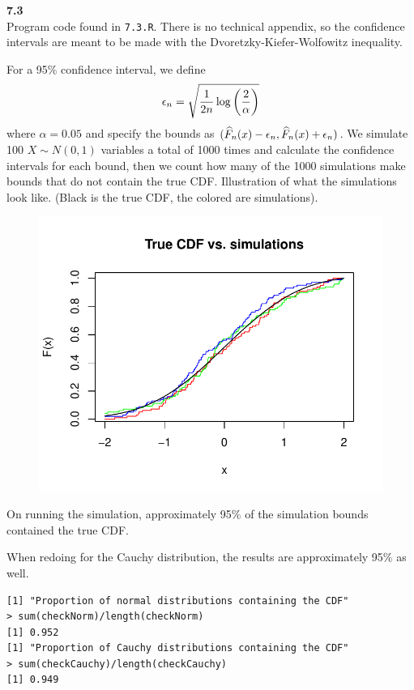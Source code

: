 \bigskip\noindent
\textbf{7.3}\\  %
Program code found in \texttt{7.3.R}. There is no technical appendix, so the confidence
intervals are meant to be made with the Dvoretzky-Kiefer-Wolfowitz inequality.

For a 95\% confidence interval, we define
$$
\epsilon_n = \sqrt{\frac{1}{2n}\log\left(\frac{2}{\alpha}\right)}
$$
where $\alpha = 0.05$ and specify the bounds as
$(\widehat{F}_n(x) - \epsilon_n, \widehat{F}_n(x) + \epsilon_n)$. We simulate 100 $X\sim N(0,1)$ variables
a total of 1000 times and calculate the confidence intervals for each bound, then we count
how many of the 1000 simulations make bounds that do not contain the true CDF.
Illustration of what the simulations look like. (Black is the true CDF, the colored are simulations).
\begin{figure}[H]
    \centering
    \includegraphics[scale=0.69]{ch7_3.pdf}
\end{figure}

\newpage\noindent
On running the simulation, approximately 95\% of the simulation bounds contained the true CDF.

When redoing for the Cauchy distribution, the results are approximately 95\% as well.
\begin{lstlisting}[style=RSyntax, title=R]
[1] "Proportion of normal distributions containing the CDF"
> sum(checkNorm)/length(checkNorm)
[1] 0.952
[1] "Proportion of Cauchy distributions containing the CDF"
> sum(checkCauchy)/length(checkCauchy)
[1] 0.949
\end{lstlisting}

